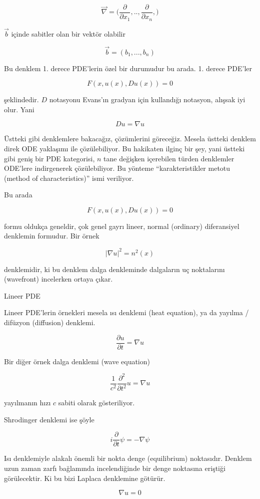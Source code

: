 \documentclass[12pt,fleqn]{article}\usepackage{../../common}
\begin{document}
$$ \vec{\nabla} = \bigg( 
\frac{\partial }{\partial x_1},.., 
\frac{\partial }{\partial x_n},
\bigg)
$$

$\vec{b}$ içinde sabitler olan bir vektör olabilir

$$ \vec{b} = (b_1,...,b_n)
 $$

Bu denklem 1. derece PDE'lerin özel bir durumudur bu arada. 1. derece
PDE'ler 

$$ F(x, u(x), Du(x)) = 0 $$

şeklindedir. $D$ notasyonu Evans'ın gradyan için kullandığı notasyon,
alışsak iyi olur. Yani

$$ Du = \nabla u $$

Üstteki gibi denklemlere bakacağız, çözümlerini göreceğiz. Mesela üstteki
denklem direk ODE yaklaşımı ile çözülebiliyor. Bu hakikaten ilginç bir şey,
yani üstteki gibi geniş bir PDE kategorisi, $n$ tane değişken içerebilen
türden denklemler ODE'lere indirgenerek çözülebiliyor. Bu yönteme
``karakteristikler metotu (method of characteristics)'' ismi veriliyor.

Bu arada

$$ F(x, u(x), Du(x)) = 0 $$

formu oldukça geneldir, çok genel gayrı lineer, normal (ordinary)
diferansiyel denklemin formudur. Bir örnek

$$ |\nabla u|^2 = n^2(x) $$

denklemidir, ki bu denklem dalga denkleminde dalgaların uç noktalarını
(wavefront) incelerken ortaya çıkar. 

Lineer PDE

Lineer PDE'lerin örnekleri mesela ısı denklemi (heat equation), ya da
yayılma / difüzyon (diffusion) denklemi.

$$ \frac{\partial u}{\partial t} = 
\nabla  u
$$

Bir diğer örnek dalga denklemi (wave equation)

$$ \frac{1}{c^2} \frac{\partial ^2}{\partial t^2}u = \nabla u$$

yayılmanın hızı $c$ sabiti olarak gösteriliyor. 

Shrodinger denklemi ise şöyle

$$ i \frac{\partial }{\partial t}\psi  = -\nabla \psi $$

Isı denklemiyle alakalı önemli bir nokta denge (equilibrium)
noktasıdır. Denklem uzun zaman zarfı bağlamında incelendiğinde bir denge
noktasına eriştiği görülecektir. Ki bu bizi Laplaca denklemine götürür. 

$$ \nabla u = 0 $$
\end{document}
